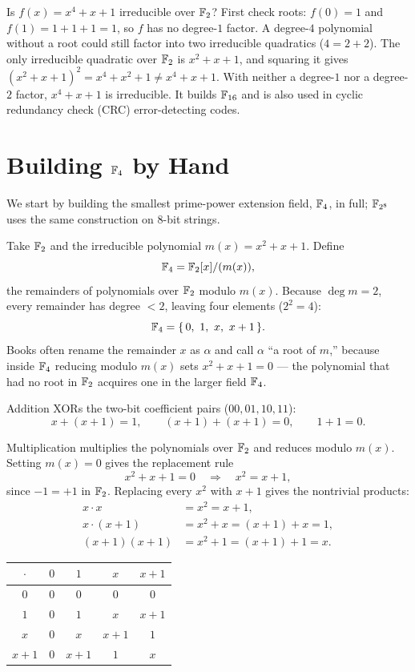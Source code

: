 \begin{walkbox}
Is $f(x) = x^4 + x + 1$ irreducible over $\mathbb{F}_2$? First check roots: $f(0)=1$
and $f(1)=1+1+1=1$, so $f$ has no degree-$1$ factor. A degree-$4$ polynomial
without a root could still factor into two irreducible quadratics ($4 = 2 + 2$).
The only irreducible quadratic over $\mathbb{F}_2$ is $x^2+x+1$, and squaring it gives
$(x^2+x+1)^2 = x^4 + x^2 + 1 \neq x^4+x+1$. With neither a degree-$1$ nor a
degree-$2$ factor, $x^4+x+1$ is irreducible. It builds $\mathbb{F}_{16}$ and is also
used in cyclic redundancy check (CRC) error-detecting codes.
\end{walkbox}

\section{Building $\mathbb{F}_4$ by Hand}
\label{ch06:build-f4}

We start by building the smallest prime-power extension field, $\mathbb{F}_4$, in full;
$\mathbb{F}_{2^8}$ uses the same construction on $8$-bit strings.

Take $\mathbb{F}_2$ and the irreducible polynomial $m(x) = x^2 + x + 1$. Define
\[
\mathbb{F}_4 = \mathbb{F}_2[x] / (m(x)),
\]
the remainders of polynomials over $\mathbb{F}_2$ modulo $m(x)$. Because $\deg m = 2$,
every remainder has degree $< 2$, leaving four elements ($2^2 = 4$):
\[
\mathbb{F}_4 = \{\, 0,\ 1,\ x,\ x+1 \,\}.
\]
Books often rename the remainder $x$ as $\alpha$ and call $\alpha$ ``a root of
$m$,'' because inside $\mathbb{F}_4$ reducing modulo $m(x)$ sets $x^2 + x + 1 = 0$ ---
the polynomial that had no root in $\mathbb{F}_2$ acquires one in the larger field
$\mathbb{F}_4$.

Addition XORs the two-bit coefficient pairs ($00, 01, 10, 11$):
\[
x + (x+1) = 1, \qquad (x+1) + (x+1) = 0, \qquad 1 + 1 = 0.
\]

Multiplication multiplies the polynomials over $\mathbb{F}_2$ and reduces modulo
$m(x)$. Setting $m(x) = 0$ gives the replacement rule
\[
x^2 + x + 1 = 0 \quad\Longrightarrow\quad x^2 = x + 1,
\]
since $-1 = +1$ in $\mathbb{F}_2$. Replacing every $x^2$ with $x+1$ gives the nontrivial
products:
\begin{align*}
x \cdot x &= x^2 = x + 1, \\
x \cdot (x+1) &= x^2 + x = (x+1) + x = 1, \\
(x+1)(x+1) &= x^2 + 1 = (x+1) + 1 = x.
\end{align*}

\begin{center}
\renewcommand{\arraystretch}{1.15}
\begin{tabular}{c|cccc}
$\cdot$ & $0$ & $1$ & $x$ & $x + 1$ \\
\hline
$0$     & $0$ & $0$ & $0$     & $0$ \\
$1$     & $0$ & $1$ & $x$     & $x + 1$ \\
$x$     & $0$ & $x$ & $x + 1$ & $1$ \\
$x + 1$ & $0$ & $x + 1$ & $1$ & $x$
\end{tabular}
\end{center}

